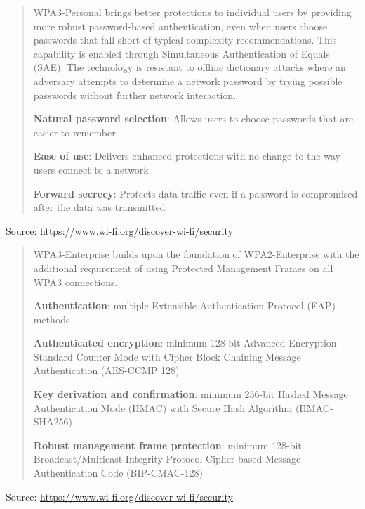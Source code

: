 \documentclass[Screen16to9,17pt]{foils}
\begin{document}
\begin{quote}
WPA3-Personal brings better protections to individual users by providing more robust password-based authentication, even when users choose passwords that fall short of typical complexity recommendations. This capability is enabled through Simultaneous Authentication of Equals (SAE). The technology is resistant to offline dictionary attacks where an adversary attempts to determine a network password by trying possible passwords without further network interaction.

\begin{list2}
\item {\bf Natural password selection}: Allows users to choose passwords that are easier to remember
\item {\bf Ease of use}: Delivers enhanced protections with no change to the way users connect to a network
\item {\bf Forward secrecy}: Protects data traffic even if a password is compromised after the data was transmitted
\end{list2}
\end{quote}

Source: \url{https://www.wi-fi.org/discover-wi-fi/security}




\begin{quote}
WPA3-Enterprise builds upon the foundation of WPA2-Enterprise with the additional requirement of using Protected Management Frames on all WPA3 connections.

\begin{list2}
\item {\bf Authentication}: multiple Extensible Authentication Protocol (EAP) methods
\item {\bf Authenticated encryption}: minimum 128-bit Advanced Encryption Standard Counter Mode with Cipher Block Chaining Message Authentication (AES-CCMP 128)
\item {\bf Key derivation and confirmation}: minimum 256-bit Hashed Message Authentication Mode (HMAC) with Secure Hash Algorithm (HMAC-SHA256)
\item {\bf Robust management frame protection}: minimum 128-bit Broadcast/Multicast Integrity Protocol Cipher-based Message Authentication Code (BIP-CMAC-128)
\end{list2}
\end{quote}

Source: \url{https://www.wi-fi.org/discover-wi-fi/security}
\end{document}
